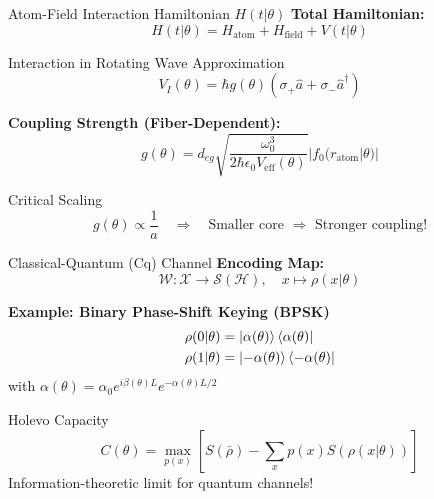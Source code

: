 \documentclass[aspectratio=169,12pt]{beamer}
\begin{document}
\begin{frame}{Atom-Field Interaction Hamiltonian $H(t|\theta)$}
\textbf{Total Hamiltonian:}
$$H(t|\theta) = H_{\text{atom}} + H_{\text{field}} + V(t|\theta)$$

\vspace{0.3cm}

\begin{block}{Interaction in Rotating Wave Approximation}
$$V_I(\theta) = \hbar g(\theta) \left( \sigma_+ \hat{a} + \sigma_- \hat{a}^\dagger \right)$$
\end{block}

\vspace{0.3cm}

\textbf{Coupling Strength (Fiber-Dependent):}
\begin{equation*}
g(\theta) = d_{eg} \sqrt{\frac{\omega_0^3}{2\hbar\epsilon_0 V_{\text{eff}}(\theta)}} |f_0(r_{\text{atom}}|\theta)|
\end{equation*}

\begin{alertblock}{Critical Scaling}
$$g(\theta) \propto \frac{1}{a} \quad \Rightarrow \quad \text{Smaller core } \Rightarrow \text{ Stronger coupling!}$$
\end{alertblock}
\end{frame}

\begin{frame}{Classical-Quantum (Cq) Channel}
\textbf{Encoding Map:}
$$\mathcal{W}: \mathcal{X} \to \mathcal{S}(\mathcal{H}), \quad x \mapsto \rho(x|\theta)$$

\vspace{0.3cm}

\textbf{Example: Binary Phase-Shift Keying (BPSK)}
\begin{align*}
\rho(0|\theta) &= \ket{\alpha(\theta)}\bra{\alpha(\theta)} \\
\rho(1|\theta) &= \ket{-\alpha(\theta)}\bra{-\alpha(\theta)}
\end{align*}
with $\alpha(\theta) = \alpha_0 e^{i\beta(\theta)L} e^{-\alpha(\theta)L/2}$

\vspace{0.3cm}

\begin{block}{Holevo Capacity}
$$C(\theta) = \max_{p(x)} \left[ S(\bar{\rho}) - \sum_x p(x) S(\rho(x|\theta)) \right]$$
Information-theoretic limit for quantum channels!
\end{block}
\end{frame}
\end{document}
